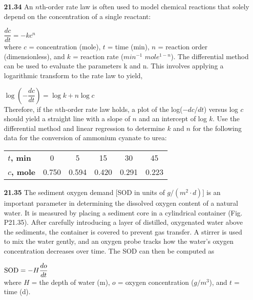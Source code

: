\documentclass[../main.tex]{subfiles}
\begin{document}
\begin{multicols}{2}
\textbf{21.34} An $n$th-order rate law is often used to model chemical
reactions that solely depend on the concentration of a single
reactant:

$ \dfrac{dc}{dt} = -kc^{n} $\\
where $c$ = concentration (mole), $t$ = time (min), $n$ =
reaction order (dimensionless), and $k$ = reaction rate 
($min^{−1}$ $mole^{1−n}$). The differential method can be used to
evaluate the parameters k and n. This involves applying a
logarithmic transform to the rate law to yield,

$ \log \left(-\dfrac{dc}{dt} \right) = \log k + n \log c $\\
Therefore, if the $n$th-order rate law holds, a plot of the
log($−dc/dt$) versus log $c$ should yield a straight line with a
slope of $n$ and an intercept of log $k$. Use the differential
method and linear regression to determine $k$ and $n$ for the
following data for the conversion of ammonium cyanate to
urea:\\
\begin{tabular}{lccccc}
	\hline

	\textbf{$t$, min} & 0 & 5 & 15 & 30 & 45\\

	\textbf{$c$, mole} & 0.750 & 0.594 & 0.420 & 0.291 & 0.223\\
	
	\hline
\end{tabular}


\textbf{21.35} The sediment oxygen demand [SOD in units of
$g/(m^2 · d)$] is an important parameter in determining the
dissolved oxygen content of a natural water. It is measured
by placing a sediment core in a cylindrical container 
(Fig. P21.35). After carefully introducing a layer of distilled,
oxygenated water above the sediments, the container is covered to prevent gas transfer. A stirrer is used to mix the water
gently, and an oxygen probe tracks how the water's oxygen
concentration decreases over time. The SOD can then be
computed as

$ \textnormal{SOD} = -H\dfrac{do}{dt} $\\
where $H$ = the depth of water (m), $o$ = oxygen concentration
($g/m^3$), and $t$ = time (d).
\end{multicols}
\end{document}
